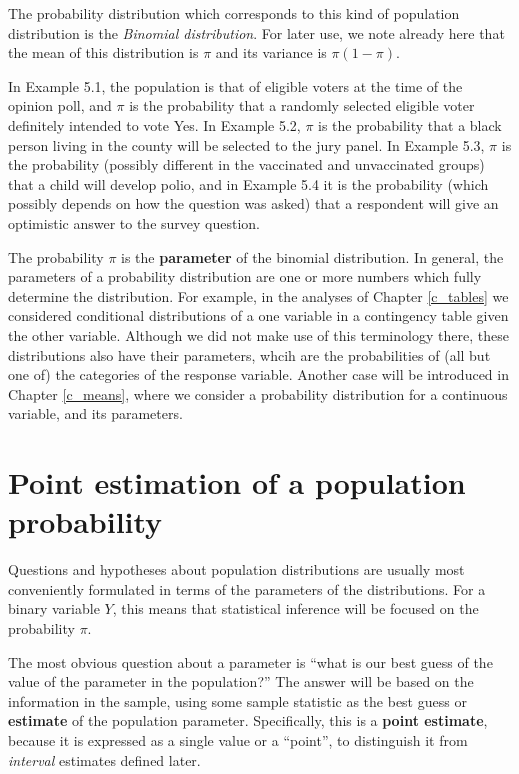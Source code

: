 \label{Binomial}
The probability distribution which corresponds to this kind of
population distribution is the \emph{Binomial distribution}.
For later use, we note already here that the mean of this distribution
is $\pi$ and its variance is $\pi(1-\pi)$.

In Example 5.1, the population is that of eligible voters at the time of
the opinion poll, and $\pi$ is the probability that a randomly selected
eligible voter definitely intended to vote Yes. In Example
5.2, $\pi$ is the probability that a black
person living in the county will be selected to the jury panel. In
Example 5.3, $\pi$ is the probability (possibly different in the
vaccinated and unvaccinated groups) that a child will develop polio, and
in Example 5.4 it is the probability (which possibly depends on how the
question was asked) that a respondent will give an optimistic answer to
the survey question.

The probability $\pi$ is the \textbf{parameter} of the binomial
distribution. In general, the parameters of a probability distribution
are one or more numbers which fully determine the distribution. For
example, in the analyses of Chapter \ref{c_tables} we considered
conditional distributions of a one variable in a contingency table
given the other variable. Although we did not make use of
this terminology there, these distributions also have their parameters,
whcih are the probabilities of (all but one of) the categories of the
response variable. Another case will be introduced in Chapter
\ref{c_means}, where we consider a probability distribution for a
continuous variable, and its parameters.

\section{Point estimation of a population probability}
\label{s_probs_pointest}

Questions and hypotheses about population distributions are usually most
conveniently formulated in terms of the parameters of the distributions.
For a binary variable $Y$, this means that statistical inference will be
focused on the probability $\pi$.

The most obvious question about a parameter is ``what is our
best guess of the value of the parameter in the population?'' The answer
will be based on the information in the sample, using some sample
statistic as the best guess or \textbf{estimate} of the population
parameter. Specifically, this is a \textbf{point estimate}, because it
is expressed as a single value or a ``point'', to distinguish it from
\emph{interval} estimates defined later.


